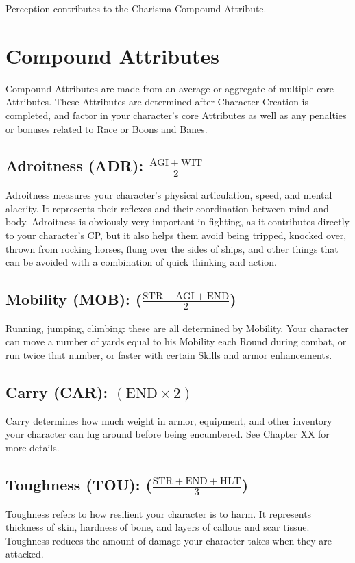\documentclass[oneside,11pt,english]{book}
\begin{document}
 
Perception contributes to the Charisma Compound Attribute. 
\section{Compound Attributes}
Compound Attributes are made from an average or aggregate of multiple core Attributes. These 
Attributes are determined after Character Creation is completed, and factor in your character’s core 
Attributes as well as any penalties or bonuses related to Race or Boons and Banes. 
\subsection*{Adroitness (ADR): $\frac{\mathrm{AGI+WIT}}{2}$}
Adroitness measures your character’s physical articulation, speed, and mental alacrity. It represents their 
reflexes and their coordination between mind and body. Adroitness is obviously very important in 
fighting, as it contributes directly to your character’s CP, but it also helps them avoid being tripped, 
knocked over, thrown from rocking horses, flung over the sides of ships, and other things that can be 
avoided with a combination of quick thinking and action. 

 
\subsection*{Mobility (MOB): ($\frac{\mathrm{STR+AGI+END}}{2}$)}
Running, jumping, climbing: these are all determined by Mobility. Your character can move a number of 
yards equal to his Mobility each Round during combat, or run twice that number, or faster with certain 
Skills and armor enhancements. 
\subsection*{Carry (CAR): $(\mathrm{END} \times 2)$}


Carry determines how much weight in armor, equipment, and other inventory your character can lug 
around before being encumbered. See Chapter XX for more details. 

 

\subsection*{Toughness (TOU): ($\frac{\mathrm{STR+END+HLT}}{3} $)}
Toughness refers to how resilient your character is to harm. It represents thickness of skin, hardness of 
bone, and layers of callous and scar tissue. Toughness reduces the amount of damage your character takes 
when they are attacked. 
\end{document}
